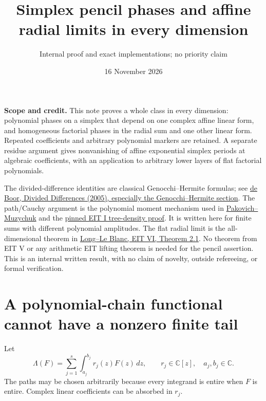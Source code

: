 \documentclass[11pt]{article}
\title{Simplex pencil phases and affine radial limits in every dimension}
\author{Internal proof and exact implementations; no priority claim}
\date{16 November 2026}
\newcommand{\C}{\mathbb C}
\begin{document}
\maketitle
\noindent\textbf{Scope and credit.}
This note proves a whole class in every dimension: polynomial phases on a
simplex that depend on one complex affine linear form, and homogeneous
factorial phases in the radial sum and one other linear form. Repeated
coefficients and arbitrary polynomial markers are retained. A separate
residue argument gives nonvanishing of affine exponential simplex periods
at algebraic coefficients, with an application to arbitrary lower layers
of flat factorial polynomials.

The divided-difference identities are classical Genocchi--Hermite formulas;
see \href{https://arxiv.org/abs/math/0502036}{de Boor, Divided Differences
(2005), especially the Genocchi--Hermite section}. The path/Cauchy argument
is the polynomial moment mechanism used in
\href{https://arxiv.org/abs/0710.4085v2}{Pakovich--Muzychuk} and the
\href{sources/long-eit-pinned.tex}{pinned EIT I tree-density proof}.
It is written here for finite sums with different polynomial amplitudes.
The flat radial limit is the all-dimensional theorem in
\href{sources/long-eit-vi-current.tex}{Long--Le Blanc, EIT VI, Theorem 2.1}.
No theorem from EIT V or any arithmetic EIT lifting theorem is needed for
the pencil assertion. This is an internal written result, with no claim
of novelty, outside refereeing, or formal verification.

\section{A polynomial-chain functional cannot have a nonzero finite tail}
Let
\[
 \Lambda(F)=\sum_{j=1}^s\int_{a_j}^{b_j} r_j(z)F(z)\,dz,
 \qquad r_j\in\C[z],\quad a_j,b_j\in\C.                    \tag{1}
\]
The paths may be chosen arbitrarily because every integrand is entire
when $F$ is entire. Complex linear coefficients can be absorbed in $r_j$.
\end{document}
